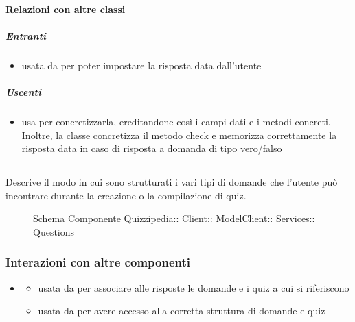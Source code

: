 \paragraph{Relazioni con altre classi}
\subparagraph{Entranti}
\begin{itemize}
\item usata da  per poter impostare la risposta data dall'utente
\end{itemize}
\subparagraph{Uscenti}
\begin{itemize}
\item usa  per concretizzarla, ereditandone così i campi dati e i metodi concreti. Inoltre, la classe concretizza il metodo check e memorizza correttamente la risposta data in caso di risposta a domanda di tipo vero/falso
\end{itemize}
\subsection{}
Descrive il modo in cui sono strutturati i vari tipi di domande che l'utente può incontrare durante la creazione o la compilazione di quiz.
\begin{figure}[H]
\centering
\noindent{}
\caption[Schema Componente Questions]{Schema Componente Quizzipedia:: Client:: ModelClient:: Services:: Questions}
\end{figure}
\subsubsection{Interazioni con altre componenti}
\begin{itemize}
\item {}
\begin{itemize}
\item usata da  per associare alle risposte le domande e i quiz a cui si riferiscono
\item usata da  per avere accesso alla corretta struttura di domande e quiz
\end{itemize}
\end{itemize}
